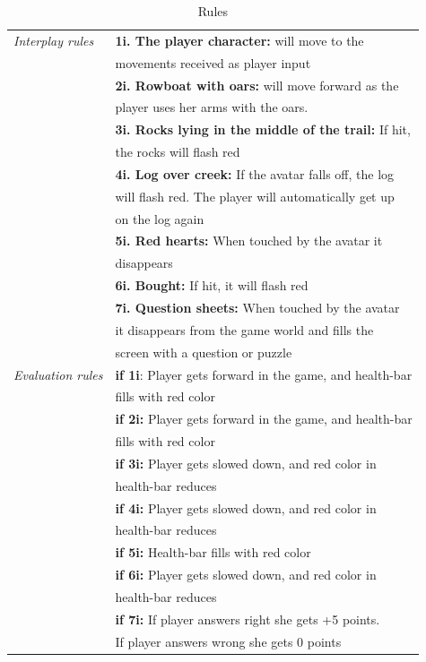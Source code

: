 \begin{table} [H]
\centering
    \begin{tabular}{|l|l|}
       \hline
	   \emph{Interplay rules} & \textbf{1i. The player character:} will move to the \\ &  movements received as player input \\ \cline{2-2}
	     & \textbf{2i. Rowboat with oars:} will move forward as the \\ & player  uses her arms with the oars. \\ \cline{2-2}
	       & \textbf{3i. Rocks lying in the middle of the trail:} If hit, \\ & the  rocks will flash red  \\ \cline{2-2}
	        & \textbf{4i. Log over creek:} If the avatar falls off, the log \\ & will flash red. The player will automatically get up \\ & on the log again \\ \cline{2-2}
	         &  \textbf{5i. Red hearts:} When touched by the avatar it \\ & disappears \\ \cline{2-2}
	          &  \textbf{6i. Bought:} If hit, it will flash red \\ \cline{2-2}
	           &  \textbf{7i. Question sheets:} When touched by the avatar \\ & it  disappears from the game world and fills the \\ & screen with  a  question or puzzle \\ \hline
	            \emph{Evaluation rules} & \textbf{if 1i}: Player gets forward in the game, and health-bar \\ & fills with red color \\ \cline{2-2}
	               & \textbf{if 2i:} Player gets forward in the game, and health-bar \\ & fills with red color   \\ \cline{2-2}
	               & \textbf{if 3i:} Player gets slowed down, and red color in \\ & health-bar reduces   \\ \cline{2-2}
	               & \textbf{if 4i:} Player gets slowed down, and red color in \\ & health-bar reduces   \\ \cline{2-2}
	               & \textbf{if 5i:} Health-bar fills with red color  \\ \cline{2-2}
	               & \textbf{if 6i:} Player gets slowed down, and red color in \\ & health-bar reduces  \\ \cline{2-2}
	               & \textbf{if 7i:} If player answers right she gets +5 points. \\ & If player answers wrong she gets 0 points  \\ \hline
    \end{tabular}
    \caption[Rules in the "Nature Trail" game]{Rules}
    \label{tab:rules1}
\end{table}  


